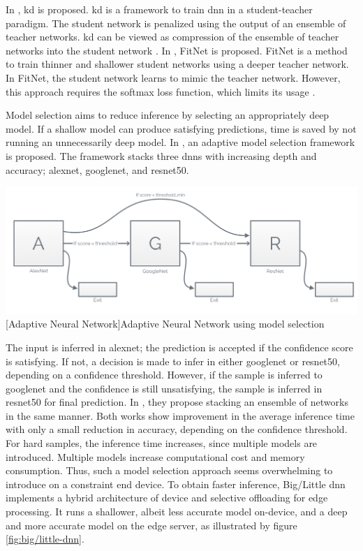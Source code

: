\begin{enumdescript}
	In \cite{hinton_distilling_2015}, \gls{kd} is proposed. \gls{kd} is a framework to train \gls{dnn} in a student-teacher paradigm. The student network is penalized using the output of an ensemble of teacher networks. \gls{kd} can be viewed as compression of the ensemble of teacher networks into the student network \cite{cheng_survey_2017}. 
	In \cite{romero_fitnets:_2014}, FitNet is proposed. FitNet is a method to train thinner and shallower student networks using a deeper teacher network. In FitNet, the student network learns to mimic the teacher network. However, this approach requires the softmax loss function, which limits its usage \cite{cheng_survey_2017}.  
	
	\item[Model Selection] Model selection aims to reduce inference by selecting an appropriately deep model. If a shallow model can produce satisfying predictions, time is saved by not running an unnecessarily deep model. In \cite{bolukbasi_adaptive_2017}, an adaptive model selection framework is proposed. The framework stacks three \gls{dnn}s with increasing depth and accuracy; \gls{alexnet}, \gls{googlenet}, and \gls{resnet}50. 
	
	\begin{minipage}[t]{\linewidth}
		\centering                           
		\includegraphics[width=.8\linewidth]{figures/models/adaptive}
		[Adaptive Neural Network]{Adaptive Neural Network using model selection}
	\end{minipage}
	
	The input is inferred in \gls{alexnet}; the prediction is accepted if the confidence score is satisfying. If not, a decision is made to infer in either \gls{googlenet} or \gls{resnet}50, depending on a confidence threshold. However, if the sample is inferred to \gls{googlenet} and the confidence is still unsatisfying, the sample is inferred in \gls{resnet}50 for final prediction. In \cite{tann_flexible_2018}, they propose stacking an ensemble of networks in the same manner. Both works show improvement in the average inference time with only a small reduction in accuracy, depending on the confidence threshold. For hard samples, the inference time increases, since multiple models are introduced. Multiple models increase computational cost and memory consumption. Thus, such a model selection approach seems overwhelming to introduce on a constraint end device. 	
	To obtain faster inference, Big/Little \gls{dnn} \cite{park_big/little_2015} implements a hybrid architecture of device and selective offloading for edge processing. It runs a shallower, albeit less accurate model on-device, and a deep and more accurate model on the edge server, as illustrated by figure \ref{fig:big/little-dnn}. 
	

\end{enumdescript}
